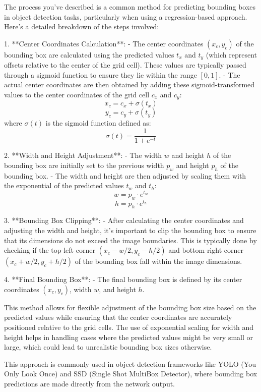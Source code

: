 The process you've described is a common method for predicting bounding boxes in object detection tasks, particularly when using a regression-based approach. Here's a detailed breakdown of the steps involved:

1. **Center Coordinates Calculation**:
   - The center coordinates \((x_c, y_c)\) of the bounding box are calculated using the predicted values \(t_x\) and \(t_y\) (which represent offsets relative to the center of the grid cell). These values are typically passed through a sigmoid function to ensure they lie within the range \([0, 1]\).
   - The actual center coordinates are then obtained by adding these sigmoid-transformed values to the center coordinates of the grid cell \(c_x\) and \(c_y\):
     \[
     x_c = c_x + \sigma(t_x)
     \]
     \[
     y_c = c_y + \sigma(t_y)
     \]
     where \(\sigma(t)\) is the sigmoid function defined as:
     \[
     \sigma(t) = \frac{1}{1 + e^{-t}}
     \]

2. **Width and Height Adjustment**:
   - The width \(w\) and height \(h\) of the bounding box are initially set to the previous width \(p_w\) and height \(p_h\) of the bounding box.
   - The width and height are then adjusted by scaling them with the exponential of the predicted values \(t_w\) and \(t_h\):
     \[
     w = p_w \cdot e^{t_w}
     \]
     \[
     h = p_h \cdot e^{t_h}
     \]

3. **Bounding Box Clipping**:
   - After calculating the center coordinates and adjusting the width and height, it's important to clip the bounding box to ensure that its dimensions do not exceed the image boundaries. This is typically done by checking if the top-left corner \((x_c - w/2, y_c - h/2)\) and bottom-right corner \((x_c + w/2, y_c + h/2)\) of the bounding box fall within the image dimensions.

4. **Final Bounding Box**:
   - The final bounding box is defined by its center coordinates \((x_c, y_c)\), width \(w\), and height \(h\).

This method allows for flexible adjustment of the bounding box size based on the predicted values while ensuring that the center coordinates are accurately positioned relative to the grid cells. The use of exponential scaling for width and height helps in handling cases where the predicted values might be very small or large, which could lead to unrealistic bounding box sizes otherwise.

This approach is commonly used in object detection frameworks like YOLO (You Only Look Once) and SSD (Single Shot MultiBox Detector), where bounding box predictions are made directly from the network output.